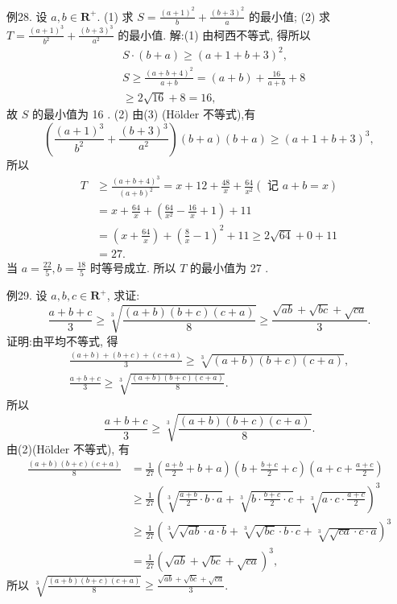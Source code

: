 例28. 设 $a, b \in \mathbf{R}^{+}$.
(1) 求 $S=\frac{(a+1)^2}{b}+\frac{(b+3)^2}{a}$ 的最小值;
(2) 求 $T=\frac{(a+1)^3}{b^2}+\frac{(b+3)^3}{a^2}$ 的最小值.
解:(1) 由柯西不等式, 得所以
$$
\begin{aligned}
& S \cdot(b+a) \geqslant(a+1+b+3)^2, \\
& S \geqslant \frac{(a+b+4)^2}{a+b}=(a+b)+\frac{16}{a+b}+8 \\
& \geqslant 2 \sqrt{16}+8=16,
\end{aligned}
$$
故 $S$ 的最小值为 16 .
(2) 由(3) (Hölder 不等式),有
$$
\left(\frac{(a+1)^3}{b^2}+\frac{(b+3)^3}{a^2}\right)(b+a)(b+a) \geqslant(a+1+b+3)^3,
$$
所以
$$
\begin{aligned}
T & \geqslant \frac{(a+b+4)^3}{(a+b)^2}=x+12+\frac{48}{x}+\frac{64}{x^2}(\text { 记 } a+b=x) \\
& =x+\frac{64}{x}+\left(\frac{64}{x^2}-\frac{16}{x}+1\right)+11 \\
& =\left(x+\frac{64}{x}\right)+\left(\frac{8}{x}-1\right)^2+11 \geqslant 2 \sqrt{64}+0+11 \\
& =27 .
\end{aligned}
$$
当 $a=\frac{22}{5}, b=\frac{18}{5}$ 时等号成立.
所以 $T$ 的最小值为 27 .



例29. 设 $a, b, c \in \mathbf{R}^{+}$, 求证:
$$
\frac{a+b+c}{3} \geqslant \sqrt[3]{\frac{(a+b)(b+c)(c+a)}{8}} \geqslant \frac{\sqrt{a b}+\sqrt{b c}+\sqrt{c a}}{3} .
$$
证明:由平均不等式, 得
$$
\begin{gathered}
\frac{(a+b)+(b+c)+(c+a)}{3} \geqslant \sqrt[3]{(a+b)(b+c)(c+a)}, \\
\frac{a+b+c}{3} \geqslant \sqrt[3]{\frac{(a+b)(b+c)(c+a)}{8}} .
\end{gathered}
$$
所以
$$
\frac{a+b+c}{3} \geqslant \sqrt[3]{\frac{(a+b)(b+c)(c+a)}{8}} .
$$
由(2)(Hölder 不等式), 有
$$
\begin{aligned}
\frac{(a+b)(b+c)(c+a)}{8} & =\frac{1}{27}\left(\frac{a+b}{2}+b+a\right)\left(b+\frac{b+c}{2}+c\right)\left(a+c+\frac{a+c}{2}\right) \\
& \geqslant \frac{1}{27}\left(\sqrt[3]{\frac{a+b}{2} \cdot b \cdot a}+\sqrt[3]{b \cdot \frac{b+c}{2} \cdot c}+\sqrt[3]{a \cdot c \cdot \frac{a+c}{2}}\right)^3 \\
& \geqslant \frac{1}{27}(\sqrt[3]{\sqrt{a b} \cdot a \cdot b}+\sqrt[3]{\sqrt{b c} \cdot b \cdot c}+\sqrt[3]{\sqrt{c a} \cdot c \cdot a})^3 \\
& =\frac{1}{27}(\sqrt{a b}+\sqrt{b c}+\sqrt{c a})^3,
\end{aligned}
$$
所以 $\sqrt[3]{\frac{(a+b)(b+c)(c+a)}{8}} \geqslant \frac{\sqrt{a b}+\sqrt{b c}+\sqrt{c a}}{3}$.



